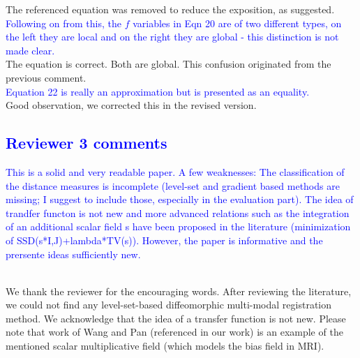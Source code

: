 \documentclass[onecolumn]{IEEEtran}
\begin{document}
The referenced equation was removed to reduce the exposition, as suggested.\\

\textcolor{blue}{Following on from this, the $f$ variables in Eqn 20 are of two different types, on the left they are local and on the right they are global - this distinction is not made clear.}\\

The equation is correct. Both are global. This confusion originated from the previous comment.\\

\textcolor{blue}{Equation 22 is really an approximation but is presented as an equality.}\\

Good observation, we corrected this in the revised version.\\

\textcolor{blue}{
\section{Reviewer 3 comments}
This is a solid and very readable paper. A few weaknesses: The classification of the distance measures is incomplete (level-set and gradient based methods are missing; I suggest to include those, especially in the evaluation part). The idea of trandfer functon is not new and more advanced relations such as the integration of an additional scalar field s have been proposed in the literature (minimization of SSD(s*I,J)+lambda*TV(s)).  However, the paper is informative and the prersente ideas sufficiently new.}\\

We thank the reviewer for the encouraging words. After reviewing the literature, we could not find any level-set-based diffeomorphic multi-modal registration method. We acknowledge that the idea of a transfer function is not new. Please note that work of Wang and Pan \cite{Wang2014} (referenced in our work) is an example of the mentioned scalar multiplicative field (which models the bias field in MRI).\\





\vspace{-0.2cm}

\end{document}
